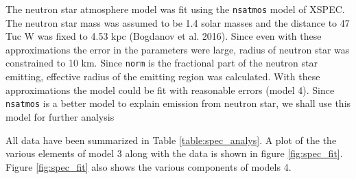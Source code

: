 \documentclass[a4paper,fleqn,usenatbib]{mnras}
\begin{document}
The neutron star atmosphere model was fit using the \texttt{nsatmos} model of XSPEC. The neutron star mass was assumed to be 1.4 
solar masses and the distance to 47 Tuc W was fixed to 4.53 kpc (Bogdanov et al. 2016). Since even with these approximations the error in the parameters were
large, radius of neutron star was constrained to 10 km. Since \texttt{norm} is the fractional part of the neutron star emitting, effective radius of the emitting region was calculated. With these approximations the model could be fit with 
reasonable errors (model 4). Since \texttt{nsatmos} is a better model to explain emission from neutron star, we shall use this model for further analysis

All data have been summarized in Table \ref{table:spec_analys}. A plot of the the various elements of model 3 along with the data
is shown in figure \ref{fig:spec_fit}. Figure \ref{fig:spec_fit} also shows the various components of models 4. 
\end{document}
